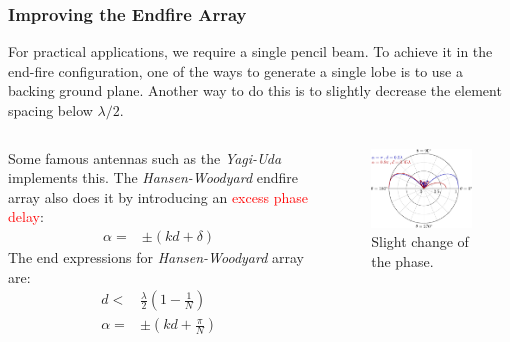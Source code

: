\documentclass[10pt]{beamer}
\begin{document}
\begin{frame}
    \frametitle{Improving the Endfire Array}
For practical applications, we require a single pencil beam. To achieve it in the end-fire configuration, one of the ways to generate a single lobe is to use a backing ground plane. Another way to do this is to slightly decrease the element spacing below $\lambda/2$.

\begin{columns}[T] %
    \begin{column}{.7\textwidth}
Some famous antennas such as the \textit{Yagi-Uda} implements this. The \textit{Hansen-Woodyard} endfire array also does it by introducing an \textcolor{red}{excess phase delay}:
\small
\begin{align*}
    \alpha {}=& \pm \left(k d + \delta \right)
\end{align*}
The end expressions for \textit{Hansen-Woodyard} array are:
\begin{align*}
    d {}<& \frac{\lambda}{2} \left(1 - \frac{1}{N}\right) \\
    \alpha {}=& \pm \left( k d + \frac{\pi }{N}\right)
\end{align*}
    \end{column}
    \begin{column}{.4\textwidth}
        \begin{figure}[t!]
            \centering
            \includegraphics[width=.95\textwidth]{endfire_two.pdf}
            \caption{Slight change of the phase.}
          \end{figure}
    \end{column}%
\end{columns}
\end{frame}
\end{document}
